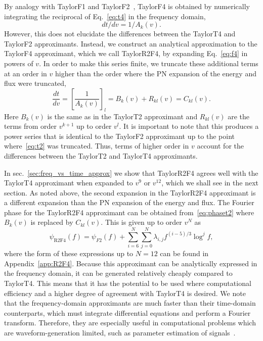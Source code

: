 By analogy with TaylorF1 and TaylorF2~\cite{Damour:2000zb,Buonanno:2009zt},
TaylorF4 is obtained by numerically integrating the reciprocal of Eq.~\eqref{eq:t4}
in the frequency domain,
%
\begin{equation}\label{eq:f4}
%
dt/dv = 1 / A_k(v).
%
\end{equation}
%
However, this does not elucidate the differences between the TaylorT4 and
TaylorF2 approximants. Instead, we construct an analytical approximation to the
TaylorF4 approximant, which we call TaylorR2F4, by expanding Eq.~\eqref{eq:f4} in
powers of $v$. In order to make this series finite, we truncate these
additional terms at an order in $v$ higher than the order where the \ac{PN}
expansion of the energy and flux were truncated,
%
\begin{equation}
%
\frac{dt}{dv} = \left[ \frac{1}{A_{k}(v)} \right]_l = B_{k}(v) + R_{kl}(v) =
C_{kl}(v).
%
\end{equation}
%
Here $B_{k}(v)$ is the same as in the TaylorT2 approximant and $R_{kl}(v)$ are
the terms from order $v^{k+1}$ up to order $v^l$. It is important to note that
this produces a power series that is identical to the TaylorF2 approximant up
to the point where~\eqref{eq:t2} was truncated.  Thus, terms of higher order in
$v$ account for the differences between the TaylorT2 and TaylorT4 approximants.

In sec.~\ref{sec:freq_vs_time_approx} we show that TaylorR2F4 agrees well with the TaylorT4 approximant
when expanded to $v^9$ or $v^{12}$, which we shall see in the next section.  As
noted above, the second expansion in the TaylorR2F4 approximant is a different
expansion than the \ac{PN} expansion of the energy and flux.  The Fourier phase
for the TaylorR2F4 approximant can be obtained from~\eqref{eq:phaset2}  where
$B_{k}(v)$ is replaced by $C_{kl}(v)$.  This is given up to order $v^N$ as
%
\begin{equation}
%
\psi_{\mathrm{R2F4}}(f) = \psi_{F2}(f) + \sum_{i=6}^{N} \sum_{j=0}^{N}
\lambda_{i, j} f^{(i-5)/3} \log^j f,
%
\end{equation}
%
where the form of these expressions up to $N=12$ can be found in
Appendix~\ref{app:R2F4}.
Because this approximant can be analytically expressed in the frequency domain,
it can be generated relatively cheaply compared to TaylorT4. This means that it has
the potential to be used where computational efficiency and 
a higher degree of agreement with TaylorT4 is desired.
We note that the frequency-domain approximants are much faster than their
time-domain counterparts, which must integrate differential equations and perform 
a Fourier transform. Therefore, they are especially useful in computational problems 
which are waveform-generation limited, 
such as parameter estimation of signals~\cite{Aasi:2013jjl}.

